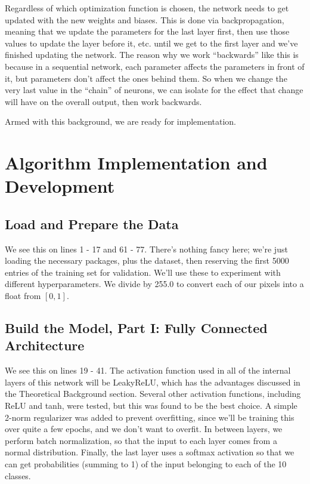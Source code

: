\documentclass[a4paper,10 pt]{article}
\begin{document}
Regardless of which optimization function is chosen, the network needs to get updated with the new weights and biases. This is done via backpropagation, meaning that we update the parameters for the last layer first, then use those values to update the layer before it, etc. until we get to the first layer and we've finished updating the network. The reason why we work ``backwards'' like this is because in a sequential network, each parameter affects the parameters in front of it, but parameters don't affect the ones behind them. So when we change the very last value in the ``chain'' of neurons, we can isolate for the effect that change will have on the overall output, then work backwards.

Armed with this background, we are ready for implementation.

\section{Algorithm Implementation and Development}
\subsection{Load and Prepare the Data}
We see this on lines 1 - 17 and 61 - 77. There's nothing fancy here; we're just loading the necessary packages, plus the dataset, then reserving the first 5000 entries of the training set for validation. We'll use these to experiment with different hyperparameters. We divide by 255.0 to convert each of our pixels into a float from $[0,1]$.

\subsection{Build the Model, Part I: Fully Connected Architecture}
We see this on lines 19 - 41. The activation function used in all of the internal layers of this network will be LeakyReLU, which has the advantages discussed in the Theoretical Background section. Several other activation functions, including ReLU and tanh, were tested, but this was found to be the best choice. A simple 2-norm regularizer was added to prevent overfitting, since we'll be training this over quite a few epochs, and we don't want to overfit. In between layers, we perform batch normalization, so that the input to each layer comes from a normal distribution. Finally, the last layer uses a softmax activation so that we can get probabilities (summing to 1) of the input belonging to each of the 10 classes.
\end{document}
